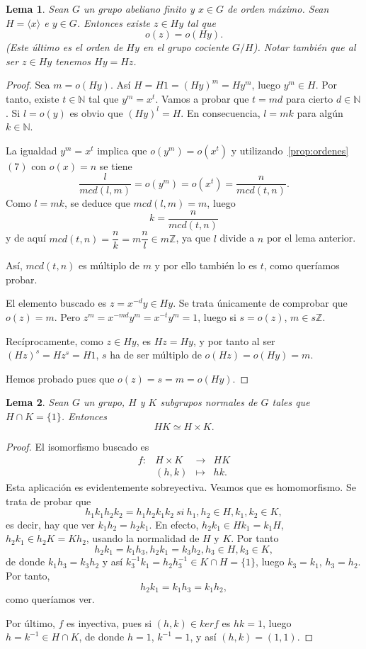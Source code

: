 \documentclass[12pt]{article}
\newtheorem{lemma}{Lema}[theorem]
\begin{document}
\begin{lemma}\label{lem:preEst1} Sean $G$ un grupo abeliano finito y $x \in G$ de orden máximo. Sean $H = \langle x \rangle$ e $y \in G$. Entonces existe $z \in Hy$ tal que $$o(z) = o(Hy).$$ (Este último es el orden de $Hy$ en el grupo cociente $G/H$). Notar también que al ser $z \in Hy$ tenemos $Hy = Hz$.
\end{lemma}
\begin{proof}
Sea $m = o(Hy)$. Así $H = H1 = (Hy)^m = Hy^m$, luego $y^m \in H$. Por tanto, existe $t \in \mathbb{N}$ tal que $y^m = x^t$. Vamos a probar que $t = md$ para cierto $d \in \mathbb{N}$. Si $l = o(y)$ es obvio que $(Hy)^l = H.$ En consecuencia, $l=mk$ para algún $k \in \mathbb{N}$. 

La igualdad $y^m = x^t$ implica que $o(y^m) = o(x^t)$ y utilizando~\ref{prop:ordenes} $(7)$ con $o(x) = n$ se tiene $$\dfrac{l}{mcd(l,m)} = o(y^m) = o(x^t) = \dfrac{n}{mcd(t,n)}.$$ Como $l = mk$, se deduce que $mcd(l,m) = m$, luego $$k = \dfrac{n}{mcd(t,n)}$$ y de aquí $mcd(t,n) = \dfrac{n}{k} = m\dfrac{n}{l} \in m\mathbb{Z}$, ya que $l$ divide a $n$ por el lema anterior. 

Así, $mcd(t,n)$ es múltiplo de $m$ y por ello también lo es $t$, como queríamos probar. 

El elemento buscado es $z=x^{-d}y \in Hy$. Se trata únicamente de comprobar que $o(z) = m$. Pero $z^m = x^{-md}y^m = x^{-t}y^m = 1$, luego si $s=o(z)$, $m \in s \mathbb{Z}$.

Recíprocamente, como $z \in Hy$, es $Hz = Hy$, y por tanto al ser $(Hz)^s = Hz^s = H1$, $s$ ha de ser múltiplo de $o(Hz) = o(Hy) = m$.

Hemos probado pues que $o(z)=s = m = o(Hy)$.

\end{proof}

\begin{lemma}\label{lem:preEst} Sean $G$ un grupo, $H$ y $K$ subgrupos normales de $G$ tales que $H \cap K = \lbrace 1 \rbrace$. Entonces $$HK \simeq H \times K.$$
\end{lemma}
\begin{proof}
El isomorfismo buscado es $$\begin{array}{rccl}
f\colon &H\times K & \longrightarrow & HK\\
&(h,k)& \longmapsto &hk.
\end{array}
$$ 
Esta aplicación es evidentemente sobreyectiva. Veamos que es homomorfismo. Se trata de probar que $$h_1k_1h_2k_2 = h_1h_2k_1k_2~si~h_1,h_2 \in H, k_1,k_2\in K,$$ es decir, hay que ver $k_1h_2 = h_2k_1.$ En efecto, $h_2k_1 \in Hk_1 = k_1H$, $h_2k_1 \in h_2K = Kh_2$, usando la normalidad de $H$ y $K$. Por tanto $$h_2k_1 = k_1h_3, h_2k_1 = k_3h_2, h_3 \in H, k_3 \in K,$$ de donde $k_1h_3 = k_3h_2$ y así $k_3^{-1}k_1 = h_2h_3^{-1} \in K \cap H = \lbrace 1 \rbrace$, luego $k_3 = k_1$, $h_3 = h_2$. Por tanto, $$h_2k_1 = k_1h_3 = k_1h_2,$$ como queríamos ver. 

Por último, $f$ es inyectiva, pues si $(h,k) \in ker f$ es $hk =1$, luego $h = k^{-1} \in H\cap K$, de donde $h = 1$, $k^{-1} = 1$, y así $(h,k)=(1,1)$.

\end{proof}
\end{document}
